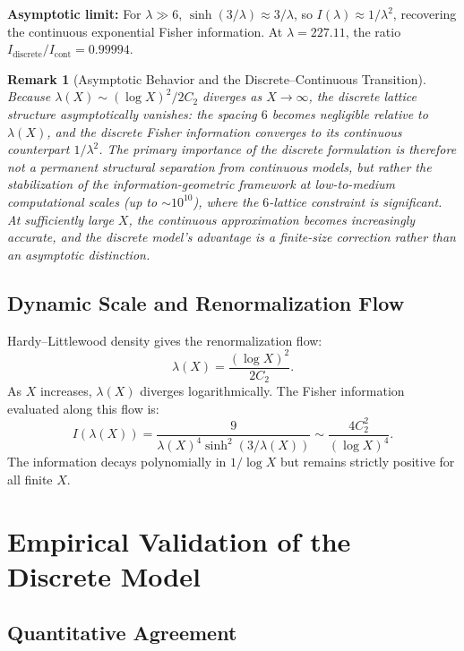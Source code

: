\documentclass[11pt]{article}
\newtheorem{remark}{Remark}
\begin{document}
\noindent \textbf{Asymptotic limit:} For $\lambda \gg 6$, $\sinh(3/\lambda) \approx 3/\lambda$, so $I(\lambda) \approx 1/\lambda^2$, recovering the continuous exponential Fisher information. At $\lambda = 227.11$, the ratio $I_{\text{discrete}}/I_{\text{cont}} = 0.99994$.

\begin{remark}[Asymptotic Behavior and the Discrete--Continuous Transition]
Because $\lambda(X) \sim (\log X)^2 / 2C_2$ diverges as $X \to \infty$, the discrete lattice structure asymptotically vanishes: the spacing $6$ becomes negligible relative to $\lambda(X)$, and the discrete Fisher information converges to its continuous counterpart $1/\lambda^2$. The primary importance of the discrete formulation is therefore not a permanent structural separation from continuous models, but rather the stabilization of the information-geometric framework at low-to-medium computational scales (up to $\sim 10^{10}$), where the $6$-lattice constraint is significant. At sufficiently large $X$, the continuous approximation becomes increasingly accurate, and the discrete model's advantage is a finite-size correction rather than an asymptotic distinction.
\end{remark}

\subsection{Dynamic Scale and Renormalization Flow}
Hardy--Littlewood density gives the renormalization flow:
\begin{equation}
    \lambda(X) = \frac{(\log X)^2}{2C_2}.
\end{equation}
As $X$ increases, $\lambda(X)$ diverges logarithmically. The Fisher information evaluated along this flow is:
\begin{equation}
    I(\lambda(X)) = \frac{9}{\lambda(X)^4 \sinh^2(3/\lambda(X))} \sim \frac{4C_2^2}{(\log X)^4}.
\end{equation}
The information decays polynomially in $1/\log X$ but remains strictly positive for all finite $X$.

\section{Empirical Validation of the Discrete Model}
\label{sec:empirical}
\subsection{Quantitative Agreement}
\end{document}
